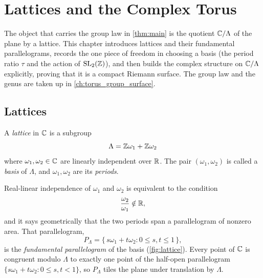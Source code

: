 \chapter{Lattices and the Complex Torus}
\label{ch:lattices}

The object that carries the group law in \cref{thm:main} is the quotient
\(\mathbb{C}/\Lambda\) of the plane by a lattice. This chapter introduces lattices and
their fundamental parallelograms, records the one piece of freedom in choosing a
basis (the period ratio \(\tau\) and the action of \(\mathrm{SL}_2(\mathbb{Z})\)), and
then builds the complex structure on \(\mathbb{C}/\Lambda\) explicitly, proving that it
is a compact Riemann surface. The group law and the genus are taken up in
\cref{ch:torus_group_surface}.

\section{Lattices}
\label{sec:lat-lattices}

\begin{definition}
\label{def:lattice}
A \emph{lattice} in \(\mathbb{C}\) is a subgroup
\[
  \Lambda = \mathbb{Z}\omega_1 + \mathbb{Z}\omega_2
\]
where \(\omega_1, \omega_2 \in \mathbb{C}\) are linearly independent over \(\mathbb{R}\). The
pair \((\omega_1, \omega_2)\) is called a \emph{basis} of \(\Lambda\), and
\(\omega_1, \omega_2\) are its \emph{periods}.
\end{definition}

Real-linear independence of \(\omega_1\) and \(\omega_2\) is equivalent to the
condition
\[
  \frac{\omega_2}{\omega_1} \notin \mathbb{R} ,
\]
and it says geometrically that the two periods span a parallelogram of nonzero
area. That parallelogram,
\[
  P_\Lambda = \{\, s\omega_1 + t\omega_2 : 0 \le s, t \le 1 \,\},
\]
is the \emph{fundamental parallelogram} of the basis (\cref{fig:lattice}). Every
point of \(\mathbb{C}\) is congruent modulo \(\Lambda\) to exactly one point of the
half-open parallelogram \(\{ s\omega_1 + t\omega_2 : 0 \le s, t < 1 \}\), so
\(P_\Lambda\) tiles the plane under translation by \(\Lambda\).


